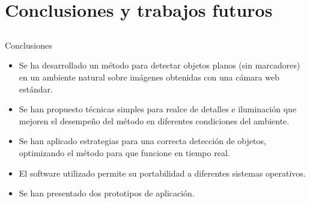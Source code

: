 \section{Conclusiones y trabajos futuros}
\subsection*{}
\begin{frame}{Conclusiones}
 \begin{itemize}
  \item Se ha desarrollado un método para detectar objetos planos (sin marcadores) en un ambiente natural sobre imágenes obtenidas con una cámara web estándar.
  \item Se han propuesto técnicas simples para realce de detalles e iluminación que mejoren el desempeño del método en diferentes condiciones del ambiente.
  \item Se han aplicado estrategias para una correcta detección de objetos, optimizando el método para que funcione en tiempo real.
  \item El software utilizado permite su portabilidad a diferentes sistemas operativos.
  \item Se han presentado dos prototipos de aplicación.
 \end{itemize}
\end{frame}

